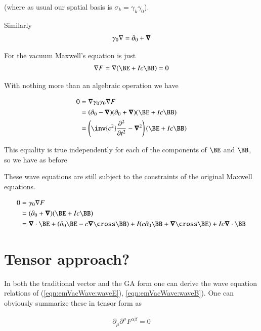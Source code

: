 (where as usual our spatial basis is $\sigma_k = \gamma_k \gamma_0$).

Similarly
\begin{align*}
\gamma_0 \nabla 
&=
\partial_0 + \boldsymbol{\nabla} \\
\end{align*}

For the vacuum Maxwell's equation is just
\begin{align*}
\grad F = \grad (\BE + I c \BB) = 0
\end{align*}

With nothing more than an algebraic operation we have

\begin{align*}
0 
&= \grad \gamma_0 \gamma_0 \grad F \\
&=
( \partial_0 - \spacegrad ) ( \partial_0 + \spacegrad ) (\BE + I c \BB) \\
&=
\left( \inv{c^2} \frac{\partial^2}{\partial t^2} - \spacegrad^2 \right) (\BE + I c \BB) \\
\end{align*}

This equality is true independently for each of the components of $\BE$ and $\BB$, so we have as before

These wave equations are still subject to the constraints of the original Maxwell equations.  

\begin{align*}
0 &= \gamma_0 \grad F \\
&= (\partial_0 + \spacegrad) (\BE + I c \BB) \\
&= 
  \spacegrad \cdot \BE 
+ (\partial_0 \BE - c \spacegrad \cross \BB)
+ I ( c \partial_0 \BB + \spacegrad \cross \BE )
+ I c \spacegrad \cdot \BB 
\\
\end{align*}

\section{Tensor approach?}

In both the traditional vector and the GA form one can derive the wave equation relations 
of (\ref{eqn:emVacWave:waveE}), \ref{eqn:emVacWave:waveB}).  One can obviously summarize these in tensor form as

\begin{align}\label{eqn:emVacWave:waveFaraday}
\partial_\mu\partial^\mu F^{\alpha\beta} = 0
\end{align}

